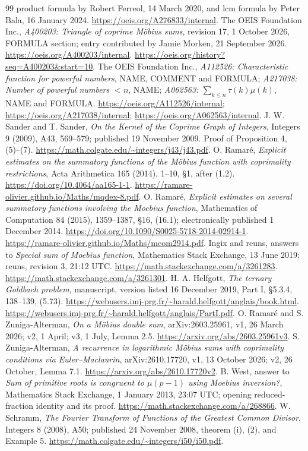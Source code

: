 \documentclass[11pt]{article}
\newcommand{\mob}{\mu}
\begin{document}
\begin{thebibliography}{99}
product formula by Robert Ferreol, 14 March 2020, and lcm formula
by Peter Bala, 16 January 2024.
\url{https://oeis.org/A276833/internal}.
 The OEIS Foundation Inc.,
\emph{A400203: Triangle of coprime M\"obius sums}, revision 17,
1 October 2026, FORMULA section; entry contributed by Jamie Morken,
21 September 2026.
\url{https://oeis.org/A400203/internal}.
\url{https://oeis.org/history?seq=A400203&start=10}.
 The OEIS Foundation Inc.,
\emph{A112526: Characteristic function for powerful numbers}, NAME,
COMMENT and FORMULA;
\emph{A217038: Number of powerful numbers $<n$}, NAME;
\emph{A062563: $\sum_{k\leq n}\tau(k)\mob(k)$}, NAME and FORMULA.
\url{https://oeis.org/A112526/internal};
\url{https://oeis.org/A217038/internal};
\url{https://oeis.org/A062563/internal}.
 J. W. Sander and T. Sander,
\emph{On the Kernel of the Coprime Graph of Integers},
Integers 9 (2009), A43, 569--579; published 19 November 2009.
Proof of Proposition 4, (5)--(7).
\url{https://math.colgate.edu/~integers/j43/j43.pdf}.
 O. Ramar\'e,
\emph{Explicit estimates on the summatory functions of the M\"obius function
with coprimality restrictions}, Acta Arithmetica 165 (2014), 1--10,
\S1, after (1.2). \url{https://doi.org/10.4064/aa165-1-1}.
\url{https://ramare-olivier.github.io/Maths/mqdex-8.pdf}.
 O. Ramar\'e,
\emph{Explicit estimates on several summatory functions involving the
Moebius function}, Mathematics of Computation 84 (2015), 1359--1387,
\S16, (16.1); electronically published 1 December 2014.
\url{https://doi.org/10.1090/S0025-5718-2014-02914-1}.
\url{https://ramare-olivier.github.io/Maths/mcom2914.pdf}.
 Ingix and reuns, answers to
\emph{Special sum of Moebius function}, Mathematics Stack Exchange,
13 June 2019; reuns, revision 3, 21:12 UTC.
\url{https://math.stackexchange.com/a/3261283}.
\url{https://math.stackexchange.com/a/3261301}.
 H. A. Helfgott,
\emph{The ternary Goldbach problem}, manuscript, version listed
16 December 2019, Part I, \S5.3.4, 138--139, (5.73).
\url{https://webusers.imj-prg.fr/~harald.helfgott/anglais/book.html}.
\url{https://webusers.imj-prg.fr/~harald.helfgott/anglais/PartI.pdf}.
 O. Ramar\'e and S. Zuniga-Alterman,
\emph{On a M\"obius double sum}, arXiv:2603.25961,
v1, 26 March 2026; v2, 1 April; v3, 1 July, Lemma 2.5.
\url{https://arxiv.org/abs/2603.25961v3}.
 S. Zuniga-Alterman,
\emph{A recurrence in logarithmic M\"obius sums with coprimality conditions
via Euler--Maclaurin}, arXiv:2610.17720,
v1, 13 October 2026; v2, 26 October, Lemma 7.1.
\url{https://arxiv.org/abs/2610.17720v2}.
 B. West, answer to
\emph{Sum of primitive roots is congruent to $\mu(p-1)$ using Moebius inversion?},
Mathematics Stack Exchange, 1 January 2013, 23:07 UTC;
opening reduced-fraction identity and its proof.
\url{https://math.stackexchange.com/a/268866}.
 W. Schramm,
\emph{The Fourier Transform of Functions of the Greatest Common Divisor},
Integers 8 (2008), A50; published 24 November 2008,
theorem (i), (2), and Example 5.
\url{https://math.colgate.edu/~integers/i50/i50.pdf}.
\end{thebibliography}
\end{document}

